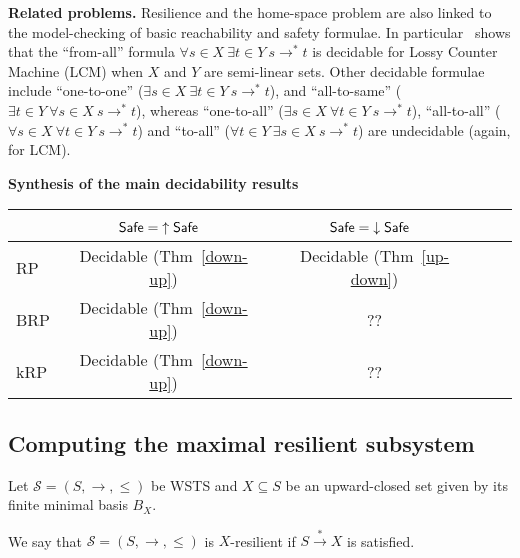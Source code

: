{\bf Related problems.} 
Resilience and the home-space problem are also linked to the 
model-checking of basic reachability and safety formulae. 
In particular~\cite{DBLP:conf/rp/Schnoebelen10} shows that the ``from-all'' formula $\forall s \in X~ \exists t \in Y~ s \to^* t$
is decidable for Lossy Counter Machine (LCM)
when $X$ and $Y$ are semi-linear sets.
Other decidable formulae include ``one-to-one'' ($\exists s \in  X ~ \exists t \in  Y ~ s \to^* 
 t$), and ``all-to-same'' ($\exists t \in  Y ~ \forall s \in  X ~ s \to^*  t$),
whereas ``one-to-all'' ($\exists s \in  X ~ \forall t \in  Y ~ s \to^*  t$), 
``all-to-all'' ($\forall s \in  X ~ \forall t \in  Y ~ s \to^*  t$)
  and ``to-all'' ($\forall t \in  Y  ~ \exists s \in  X ~ s \to^*  t$) are undecidable (again, for LCM). 
  
  
  





{\bf Synthesis of the main decidability results}\label{synthesis}
\begin{center}
\begin{tabular}{ | l | c | c | c | r |}
\hline   \ %
		& $\textsf{Safe} = {\uparrow \textsf{Safe}}$~ 
		 & $\textsf{Safe} = {\downarrow \textsf{Safe}}$~ 
 \\ \hline
   RP %
   	& Decidable (Thm~\ref{down-up})  
   		 & Decidable (Thm~\ref{up-down}) 
    \\ \hline
   BRP %
   &  Decidable (Thm~\ref{down-up}) 
   		 & ?? 
    \\ \hline
      kRP %
      & Decidable (Thm~\ref{down-up}) 
      		& ?? 
       \\ \hline
 \end{tabular}
\end{center}


\subsection{Computing the maximal resilient subsystem}

Let $\mathscr{S}=(S, \rightarrow, \leq)$ be WSTS and $X \subseteq S$ be an upward-closed set given by its finite minimal basis $B_X$. 

\begin{definition}
We say that $\mathscr{S}=(S, \rightarrow, \leq)$ is $X$-resilient if $S  \xrightarrow{*} X$ is satisfied.  
\end{definition}

